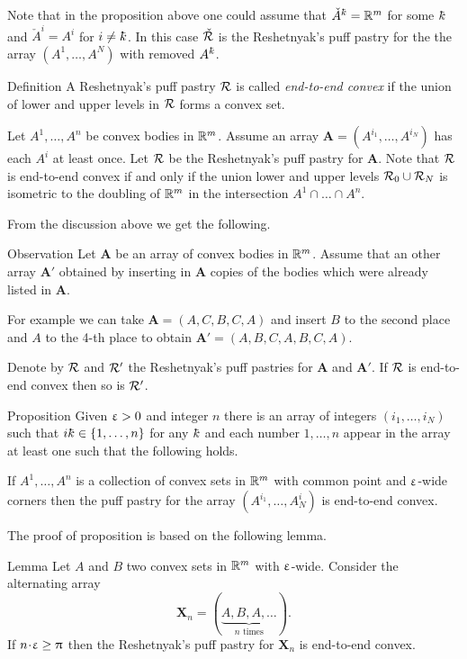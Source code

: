 Note that in the proposition above one could assume that $\check A^\kay=\RR^m$ for some $\kay$
and $\check A^i=A^i$ for $i\ne \kay$.
In this case $\check{\mathcal{R}}$ 
is the Reshetnyak's  puff pastry for the 
the array $(A^1,\dots,A^N)$ with removed $A^\kay$. 

\begin{thm}{Definition}
A Reshetnyak's puff pastry $\mathcal{R}$ 
is called \emph{end-to-end convex} 
if the union of lower and upper levels in $\mathcal{R}$ 
forms a convex set.
\end{thm}

Let $A^1,\dots,A^n$ be convex bodies in $\mathbb{R}^m$.
Assume an array $\bm{A}=(A^{i_1},\dots, A^{i_N})$
has each $A^i$ at least once. 
Let $\mathcal{R}$ be the Reshetnyak's puff pastry for $\bm{A}$.
Note that $\mathcal{R}$ is end-to-end convex
if and only if the union lower and upper levels
$\spc{R}_0\cup\spc{R}_N$ is isometric to the doubling of $\mathbb{R}^m$ in the intersection $A^1\cap\dots\cap A^n$.

From the discussion above we get the following.

\begin{thm}{Observation}
Let $\bm{A}$ be an array of convex bodies in $\mathbb{R}^m$.
Assume that an other array $\bm{A}'$
obtained by inserting in $\bm{A}$
copies of the bodies which were already listed in $\bm{A}$.

For example we can take $\bm{A}=(A,C,B,C,A)$ 
and insert $B$ to the second place and $A$ to the 4-th place to obtain $\bm{A}'=(A,B,C,A,B,C,A)$.

Denote by $\mathcal{R}$ and $\mathcal{R}'$ 
the Reshetnyak's puff pastries for $\bm{A}$ and $\bm{A}'$.
If $\mathcal{R}$ is end-to-end convex then so is $\mathcal{R}'$.
\end{thm}


\begin{thm}{Proposition}\label{prop:end-to-end-convex}
Given $\upvarepsilon>0$ and integer $n$
there is an array of integers $(i_1,\dots,i_N)$ 
such that $i\kay\in\{1,\dots,n\}$ for any $\kay$ 
and each number $1,\dots,n$ appear in the array at least one
such that the following holds.

If $A^1,\dots,A^n$ is a collection of convex sets in $\mathbb{R}^m$ with common point 
and $\upvarepsilon$-wide corners 
then the puff pastry for the array
$(A^{i_1},\dots,A^i_N)$ is end-to-end convex.
\end{thm}

The proof of proposition is based on the following lemma.

\begin{thm}{Lemma}\label{lem:end-to-end-convex}
Let $A$ and $B$ two convex sets in $\mathbb{R}^m$ with $\upvarepsilon$-wide.
Consider the alternating array
\[\bm{X}_n=(\underbrace{A,B,A,\dots}_{\text{$n$ times}}).\]
If $n\cdot\eps\ge\pi$
then the Reshetnyak's puff pastry for $\bm{X}_n$ is end-to-end convex. 
\end{thm}

